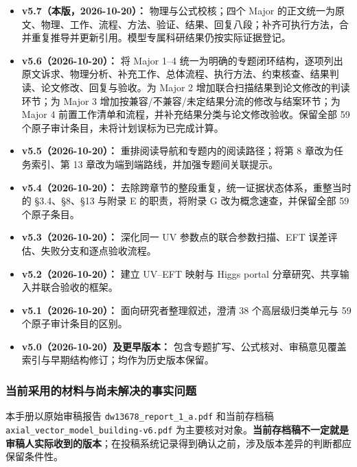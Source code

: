 \documentclass[
  chinese,
  UTF8]{ctexart}
\begin{document}
\begin{itemize}
\item
  \textbf{v5.7（本版，2026-10-20）：} 物理与公式校核；四个 Major
  的正文统一为原文、物理、工作、流程、方法、验证、结果、回复八段；补齐可执行方法，合并重复推导并更新引用。模型专属科研结果仍按实际证据登记。
\item
  \textbf{v5.6（2026-10-20）：} 将 Major 1--4
  统一为明确的专题闭环结构，逐项列出原文诉求、物理分析、补充工作、总体流程、执行方法、约束核查、结果判读、论文修改、回复与验收。为
  Major 2 增加联合扫描结果到论文修改的判读环节；为 Major 3
  增加按兼容/不兼容/未定结果分流的修改与结案环节；为 Major 4
  前置工作清单和流程，并补充结果分类与论文修改验收。保留全部 59
  个原子审计条目，未将计划误标为已完成计算。
\item
  \textbf{v5.5（2026-10-20）：} 重排阅读导航和专题内的阅读路径；将第 8
  章改为任务索引、第 13 章改为端到端路线，并加强专题间关联提示。
\item
  \textbf{v5.4（2026-10-20）：}
  去除跨章节的整段重复，统一证据状态体系，重整当时的 §3.4、§8、§13
  与附录 E 的职责，将附录 G 改为概念速查，并保留全部 59 个原子条目。
\item
  \textbf{v5.3（2026-10-20）：} 深化同一 UV 参数点的联合参数扫描、EFT
  误差评估、失败分支和逐点验收流程。
\item
  \textbf{v5.2（2026-10-20）：} 建立 UV--EFT 映射与 Higgs portal
  分章研究、共享输入并联合验收的框架。
\item
  \textbf{v5.1（2026-10-20）：} 面向研究者整理叙述，澄清 38
  个高层级归类单元与 59 个原子审计条目的区别。
\item
  \textbf{v5.0（2026-10-20）及更早版本：}
  包含专题扩写、公式核对、审稿意见覆盖索引与早期结构修订；均作为历史版本保留。
\end{itemize}

\subsubsection{当前采用的材料与尚未解决的事实问题}\label{ux5f53ux524dux91c7ux7528ux7684ux6750ux6599ux4e0eux5c1aux672aux89e3ux51b3ux7684ux4e8bux5b9eux95eeux9898}

本手册以原始审稿报告 \texttt{dw13678\_report\_1\_a.pdf} 和当前存档稿
\texttt{axial\_vector\_model\_building-v6.pdf}
为主要核对对象。\textbf{当前存档稿不一定就是审稿人实际收到的版本}；在投稿系统记录得到确认之前，涉及版本差异的判断都应保留条件性。
\end{document}
